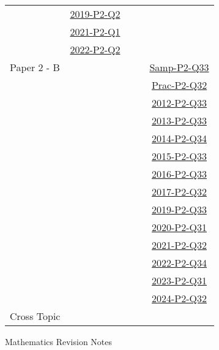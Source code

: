 \documentclass[12pt, a4paper]{article}
\begin{document}
\begin{absolutelynopagebreak}
\begin{center}
\begin{tabular}{|l|c|c|c|c|}
& \hyperref[DSE2019-CoreP2-Q02]{2019-P2-Q2} &  &  &  \\
& \hyperref[DSE2021-CoreP2-Q01]{2021-P2-Q1} &  &  &  \\
& \hyperref[DSE2022-CoreP2-Q02]{2022-P2-Q2} &  &  &  \\
\hline
Paper 2 - B&  &  &  & \hyperref[DSE2012S-CoreP2-Q33]{Samp-P2-Q33} \\
&  &  &  & \hyperref[DSE2012P-CoreP2-Q32]{Prac-P2-Q32} \\
&  &  &  & \hyperref[DSE2012-CoreP2-Q33]{2012-P2-Q33} \\
&  &  &  & \hyperref[DSE2013-CoreP2-Q33]{2013-P2-Q33} \\
&  &  &  & \hyperref[DSE2014-CoreP2-Q34]{2014-P2-Q34} \\
&  &  &  & \hyperref[DSE2015-CoreP2-Q33]{2015-P2-Q33} \\
&  &  &  & \hyperref[DSE2016-CoreP2-Q33]{2016-P2-Q33} \\
&  &  &  & \hyperref[DSE2017-CoreP2-Q32]{2017-P2-Q32} \\
&  &  &  & \hyperref[DSE2019-CoreP2-Q33]{2019-P2-Q33} \\
&  &  &  & \hyperref[DSE2020-CoreP2-Q31]{2020-P2-Q31} \\
&  &  &  & \hyperref[DSE2021-CoreP2-Q32]{2021-P2-Q32} \\
&  &  &  & \hyperref[DSE2022-CoreP2-Q34]{2022-P2-Q34} \\
&  &  &  & \hyperref[DSE2023-CoreP2-Q31]{2023-P2-Q31} \\
&  &  &  & \hyperref[DSE2024-CoreP2-Q32]{2024-P2-Q32} \\
\hline
\hline
Cross Topic&  &  &  &  \\
\hline
\end{tabular}
\end{center}
\end{absolutelynopagebreak}
\newpage
\newpage
\thispagestyle{empty}
\begin{center}
Mathematics Revision Notes\\\vspace{1cm}
\\\vspace{1cm}
{\fontsize{24pt}{24pt}\selectfont {Introduction to Deductive Geometry}} \\\vspace{1cm}
\label{chapter:S2-9}

\end{center}
\vspace{0.5cm}
\hline
\end{document}
